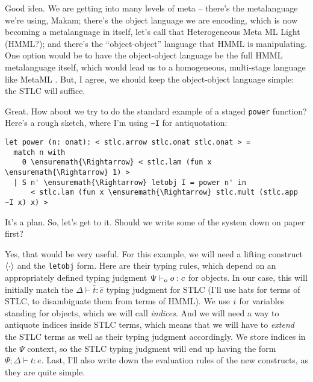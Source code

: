 \heroADVISOR{} Good idea. We are getting into many levels of meta -- there's
the metalanguage we're using, Makam; there's the object language we are
encoding, which is now becoming a metalanguage in itself, let's call
that Heterogeneous Meta ML Light (HMML?); and there's the
``object-object'' language that HMML is manipulating. One option would
be to have the object-object language be the full HMML metalanguage
itself, which would lead us to a homogeneous, multi-stage language like
MetaML \citep{metaml-main-reference}. But, I agree, we should keep the
object-object language simple: the STLC will suffice.

\heroSTUDENT{} Great. How about we try to do the standard example of a staged
\texttt{power} function? Here's a rough sketch, where I'm using
\texttt{\textasciitilde{}I} for antiquotation:

\begin{verbatim}
let power (n: onat): < stlc.arrow stlc.onat stlc.onat > =
  match n with
    0 \ensuremath{\Rightarrow} < stlc.lam (fun x \ensuremath{\Rightarrow} 1) >
  | S n' \ensuremath{\Rightarrow} letobj I = power n' in
      < stlc.lam (fun x \ensuremath{\Rightarrow} stlc.mult (stlc.app ~I x) x) >
\end{verbatim}

\heroADVISOR{} It's a plan. So, let's get to it. Should we write some of the
system down on paper first?

\heroSTUDENT{} Yes, that would be very useful. For this example, we will need
a lifting construct \(\langle\cdot\rangle\) and the \texttt{letobj} form. Here
are their typing rules, which depend on an appropriately defined typing
judgment \(\Psi \vdash_{\text{o}} o : c\) for objects. In our case, this will
initially match the \(\Delta \vdash \hat{t} : \hat{e}\) typing judgment
for STLC (I'll use hats for terms of STLC, to disambiguate them from
terms of HMML). We use \(i\) for variables standing for objects,
which we will call \emph{indices}. And we will need a way to antiquote
indices inside STLC terms, which means that we will have to
\emph{extend} the STLC terms as well as their typing judgment
accordingly. We store indices in the \(\Psi\) context, so the STLC
typing judgment will end up having the form
\(\Psi; \Delta \vdash t : e\). Last, I'll also write down the evaluation
rules of the new constructs, as they are quite simple.

\newcommand\stlce[0]{\hat{e}}
\newcommand\stlct[0]{\hat{t}}
\newcommand\stlc[1]{\hat{#1}}

